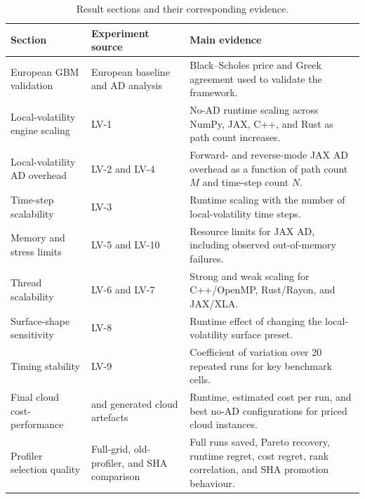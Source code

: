 \begin{table}[htbp]
\centering
\footnotesize
\caption{Result sections and their corresponding evidence.}
\label{tab:results-roadmap}
\begin{tabularx}{\textwidth}{p{}p{}Y}
\toprule
\textbf{Section} &
\textbf{Experiment source} &
\textbf{Main evidence} \\
\midrule
European GBM validation &
European baseline and AD analysis &
Black--Scholes price and Greek agreement used to validate the framework. \\

Local-volatility engine scaling &
LV-1 &
No-AD runtime scaling across NumPy, JAX, C++, and Rust as path count
increases. \\

Local-volatility AD overhead &
LV-2 and LV-4 &
Forward- and reverse-mode JAX AD overhead as a function of path count \(M\)
and time-step count \(N\). \\

Time-step scalability &
LV-3 &
Runtime scaling with the number of local-volatility time steps. \\

Memory and stress limits &
LV-5 and LV-10 &
Resource limits for JAX AD, including observed out-of-memory failures. \\

Thread scalability &
LV-6 and LV-7 &
Strong and weak scaling for C++/OpenMP, Rust/Rayon, and JAX/XLA. \\

Surface-shape sensitivity &
LV-8 &
Runtime effect of changing the local-volatility surface preset. \\

Timing stability &
LV-9 &
Coefficient of variation over 20 repeated runs for key benchmark cells. \\

Final cloud cost-performance &
 and generated cloud artefacts &
Runtime, estimated cost per run, and best no-AD configurations for priced
cloud instances. \\

Profiler selection quality &
Full-grid, old-profiler, and SHA comparison &
Full runs saved, Pareto recovery, runtime regret, cost regret, rank
correlation, and SHA promotion behaviour. \\
\bottomrule
\end{tabularx}
\end{table}

